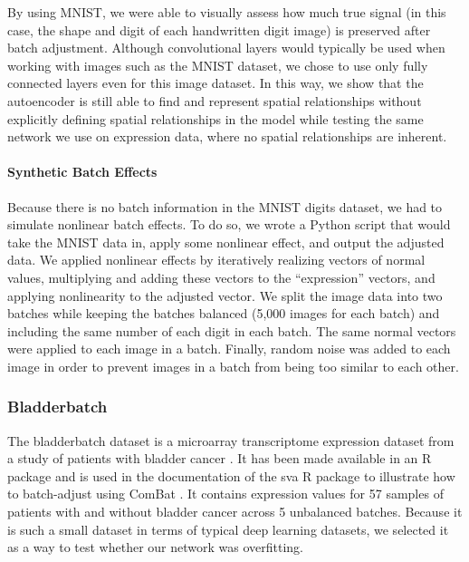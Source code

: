 \documentclass[notitlepage]{article}
\begin{document}
By using MNIST, we were able to visually assess how much true signal (in this case, the shape and digit of each handwritten digit image) is preserved after batch adjustment.
Although convolutional layers would typically be used when working with images such as the MNIST dataset, we chose to use only fully connected layers even for this image dataset.
In this way, we show that the autoencoder is still able to find and represent spatial relationships without explicitly defining spatial relationships in the model while testing the same network we use on expression data, where no spatial relationships are inherent.

\paragraph{Synthetic Batch Effects}

Because there is no batch information in the MNIST digits dataset, we had to simulate nonlinear batch effects.
To do so, we wrote a Python script that would take the MNIST data in, apply some nonlinear effect, and output the adjusted data.
We applied nonlinear effects by iteratively realizing vectors of normal values, multiplying and adding these vectors to the ``expression'' vectors, and applying nonlinearity to the adjusted vector.
We split the image data into two batches while keeping the batches balanced (5,000 images for each batch) and including the same number of each digit in each batch.
The same normal vectors were applied to each image in a batch.
Finally, random noise was added to each image in order to prevent images in a batch from being too similar to each other.

\subsubsection{Bladderbatch}

The bladderbatch dataset is a microarray transcriptome expression dataset from a study of patients with bladder cancer \cite{dyrskjot_gene_2004}.
It has been made available in an R package \cite{leek_bladderbatch_2017} and is used in the documentation of the sva R package to illustrate how to batch-adjust using ComBat \cite{leek_sva_2017}.
It contains expression values for 57 samples of patients with and without bladder cancer across 5 unbalanced batches.
Because it is such a small dataset in terms of typical deep learning datasets, we selected it as a way to test whether our network was overfitting.
\end{document}
